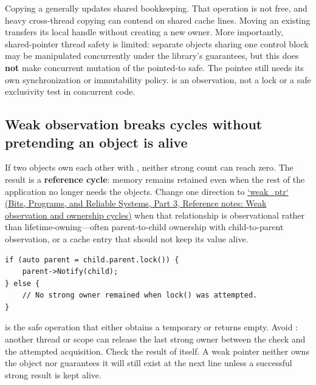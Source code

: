 Copying a  generally updates shared bookkeeping. That operation is not free, and heavy cross-thread copying can contend on shared cache lines. Moving an existing  transfers its local handle without creating a new owner. More importantly, shared-pointer thread safety is limited: separate  objects sharing one control block may be manipulated concurrently under the library's guarantees, but this does \textbf{not} make concurrent mutation of the pointed-to  safe. The pointee still needs its own synchronization or immutability policy.  is an observation, not a lock or a safe exclusivity test in concurrent code.

\subsection{Weak observation breaks cycles without pretending an object is alive}\label{05-engine-i-ch004-weak-observation-breaks-cycles-without-pretending-an-object-is-alive}

\hypertarget{05-engine-i-ch004-weak-observation-breaks-cycles-without-pretending-an-object-is-alive}{}

If two objects own each other with , neither strong count can reach zero. The result is a \textbf{reference cycle}: memory remains retained even when the rest of the application no longer needs the objects. Change one direction to \href{../01-Bits-Programs-and-Reliable-Systems-P03/main.pdf\#appendix-b9548675eb2b}{`weak\_ptr` (Bits, Programs, and Reliable Systems, Part 3, Reference notes: Weak observation and ownership cycles)} when that relationship is observational rather than lifetime-owning---often parent-to-child ownership with child-to-parent observation, or a cache entry that should not keep its value alive.

\begin{verbatim}
if (auto parent = child.parent.lock()) {
    parent->Notify(child);
} else {
    // No strong owner remained when lock() was attempted.
}
\end{verbatim}

 is the safe operation that either obtains a temporary  or returns empty. Avoid : another thread or scope can release the last strong owner between the check and the attempted acquisition. Check the result of  itself. A weak pointer neither owns the object nor guarantees it will still exist at the next line unless a successful strong result is kept alive.

